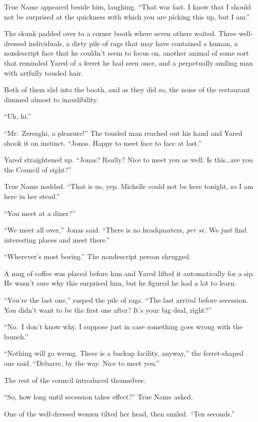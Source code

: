 True Name appeared beside him, laughing. ``That was fast. I know that I should not be surprised at the quickness with which you are picking this up, but I am.''

The skunk padded over to a corner booth where seven others waited. Three well-dressed individuals, a dirty pile of rags that may have contained a human, a nondescript face that he couldn't seem to focus on, another animal of some sort that reminded Yared of a ferret he had seen once, and a perpetually smiling man with artfully tousled hair.

Both of them slid into the booth, and as they did so, the noise of the restaurant dimmed almost to inaudibility.

``Uh, hi.''

``Mr.~Zerezghi, a pleasure!'' The tousled man reached out his hand and Yared shook it on instinct. ``Jonas. Happy to meet face to face at last.''

Yared straightened up. ``Jonas? Really? Nice to meet you as well. Is this\ldots are you the Council of eight?''

True Name nodded. ``That is us, yep. Michelle could not be here tonight, so I am here in her stead.''

``You meet at a diner?''

``We meet all over,'' Jonas said. ``There is no headquarters, \emph{per se.} We just find interesting places and meet there.''

``Wherever's most boring.'' The nondescript person shrugged.

A mug of coffee was placed before him and Yared lifted it automatically for a sip. He wasn't sure why this surprised him, but he figured he had a lot to learn.

``You're the last one,'' rasped the pile of rags. ``The last arrival before secession. You didn't want to be the first one after? It's your big deal, right?''

``No.~I don't know why. I suppose just in case something goes wrong with the launch.''

``Nothing will go wrong. There is a backup facility, anyway,'' the ferret-shaped one said. ``Debarre, by the way. Nice to meet you.''

The rest of the council introduced themselves.

``So, how long until secession takes effect?'' True Name asked.

One of the well-dressed women tilted her head, then smiled. ``Ten seconds.''

